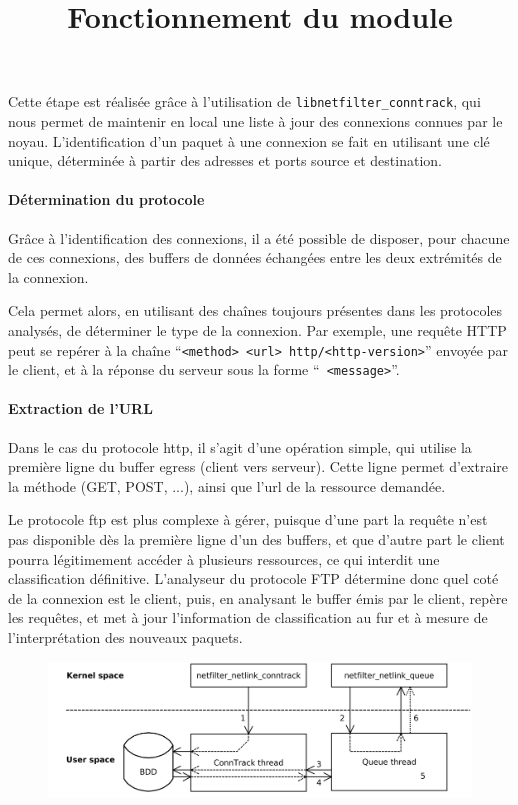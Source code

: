     Cette étape est réalisée grâce à l'utilisation de \verb+libnetfilter_conntrack+, qui nous permet de
    maintenir en local une liste à jour des connexions connues par le noyau. L'identification d'un paquet
    à une connexion se fait en utilisant une clé unique, déterminée à partir des adresses et ports source
    et destination.

  \paragraph{Détermination du protocole}
    Grâce à l'identification des connexions, il a été possible de disposer, pour chacune de ces connexions,
    des buffers de données échangées entre les deux extrémités de la connexion.
    
    Cela permet alors, en utilisant des chaînes toujours présentes dans les protocoles analysés, de déterminer
    le type de la connexion. Par exemple, une requête HTTP peut se repérer à la chaîne ``{\tt <method> <url> http/<http-version>}''
    envoyée par le client, et à la réponse du serveur sous la forme ``{\tt <numerical-code> <message>}''.

  \paragraph{Extraction de l'URL}
    Dans le cas du protocole http, il s'agit d'une opération simple, qui utilise la première ligne du buffer egress (client
    vers serveur). Cette ligne permet d'extraire la méthode (GET, POST, ...), ainsi que l'url de la ressource demandée.
    
    Le protocole ftp est plus complexe à gérer, puisque d'une part la requête n'est pas disponible dès la première ligne d'un des buffers,
    et que d'autre part le client pourra légitimement accéder à plusieurs ressources, ce qui interdit une classification définitive.
    L'analyseur du protocole FTP détermine donc quel coté de la connexion est le client, puis, en analysant le buffer émis par le client,
    repère les requêtes, et met à jour l'information de classification au fur et à mesure de l'interprétation des nouveaux paquets.
    

  \begin{figure}[h]
    \centering
    \includegraphics[width=\textwidth]{schema2.png}\\
    \title{Fonctionnement du module}
  \end{figure}

